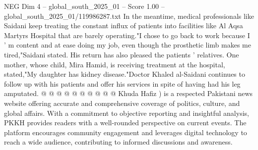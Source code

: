 \begin{textsample}{NEG Dim 4 – global\_south\_2025\_01 – Score 1.00 – global\_south\_2025\_01/119986287.txt}
In the meantime, medical professionals like Saidani keep treating the constant influx of patients into facilities like Al Aqsa Martyrs Hospital that are barely operating."I chose to go back to work because I ' m content and at ease doing my job, even though the prosthetic limb makes me tired,"Saidani stated.
His return has also pleased the patients ' relatives.
One mother, whose child, Mira Hamid, is receiving treatment at the hospital, stated,"My daughter has kidney disease."Doctor Khaled al-Saidani continues to follow up with his patients and offer his services in spite of having had his leg amputated. @ @ @ @ @ @ @ @ @ @ Khuda Hafiz ) is a respected Pakistani news website offering accurate and comprehensive coverage of politics, culture, and global affairs.
With a commitment to objective reporting and insightful analysis, PKKH provides readers with a well-rounded perspective on current events.
The platform encourages community engagement and leverages digital technology to reach a wide audience, contributing to informed discussions and awareness.

\end{textsample}
